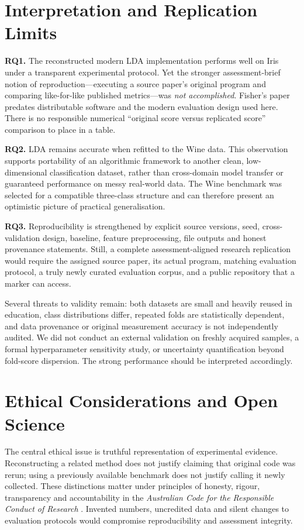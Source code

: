 \documentclass[11pt]{article}
\begin{document}
\section{Interpretation and Replication Limits}
\textbf{RQ1.} The reconstructed modern LDA implementation performs well on Iris under a transparent experimental protocol. Yet the stronger assessment-brief notion of reproduction---executing a source paper's original program and comparing like-for-like published metrics---was \emph{not accomplished}. Fisher's paper predates distributable software and the modern evaluation design used here. There is no responsible numerical ``original score versus replicated score'' comparison to place in a table.

\textbf{RQ2.} LDA remains accurate when refitted to the Wine data. This observation supports portability of an algorithmic framework to another clean, low-dimensional classification dataset, rather than cross-domain model transfer or guaranteed performance on messy real-world data. The Wine benchmark was selected for a compatible three-class structure and can therefore present an optimistic picture of practical generalisation.

\textbf{RQ3.} Reproducibility is strengthened by explicit source versions, seed, cross-validation design, baseline, feature preprocessing, file outputs and honest provenance statements. Still, a complete assessment-aligned research replication would require the assigned source paper, its actual program, matching evaluation protocol, a truly newly curated evaluation corpus, and a public repository that a marker can access.

Several threats to validity remain: both datasets are small and heavily reused in education, class distributions differ, repeated folds are statistically dependent, and data provenance or original measurement accuracy is not independently audited. We did not conduct an external validation on freshly acquired samples, a formal hyperparameter sensitivity study, or uncertainty quantification beyond fold-score dispersion. The strong performance should be interpreted accordingly.

\section{Ethical Considerations and Open Science}
The central ethical issue is truthful representation of experimental evidence. Reconstructing a related method does not justify claiming that original code was rerun; using a previously available benchmark does not justify calling it newly collected. These distinctions matter under principles of honesty, rigour, transparency and accountability in the \textit{Australian Code for the Responsible Conduct of Research} \citep{australiancode2018}. Invented numbers, uncredited data and silent changes to evaluation protocols would compromise reproducibility and assessment integrity.
\end{document}
